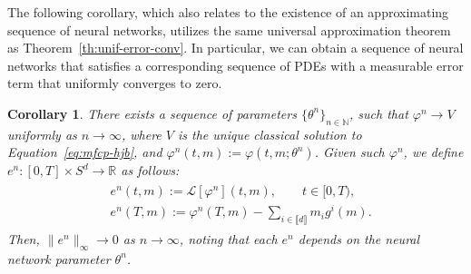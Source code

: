 \documentclass[11pt,reqno]{amsart}
\numberwithin{equation}{section}
\theoremstyle{plain}
\newtheorem{corollary}[theorem]{Corollary}
\newcommand{\R}{\mathbb{R}}
\newcommand{\sL}{\mathcal{L}}
\newcommand{\N}{\mathbb{N}}
\newcommand{\lbrs}[1]{\llbracket #1 \rrbracket}
\begin{document}
The following corollary, which also relates to the existence of an approximating sequence of neural networks, utilizes the same universal approximation theorem as Theorem~\ref{th:unif-error-conv}. In particular, we can obtain a sequence of neural networks that satisfies a corresponding sequence of PDEs with a measurable error term that uniformly converges to zero.
\begin{corollary}
\label{corr:convergence-to-v}
There exists a sequence of 
parameters $\{\theta^n\}_{n \in \N}$, such that $\varphi^n \to V$ uniformly as $n \to \infty$, where $V$ is the unique classical solution to Equation~\eqref{eq:mfcp-hjb},
and $\varphi^n(t,m):=\varphi(t,m;\theta^n)$.
Given such $\varphi^n$, we define $e^n : [0, T] \times S^d \to \R$ as follows:
\begin{align}
\label{eq:corr-hjb}
\begin{split}
    &e^n(t, m):=\sL[\varphi^n](t, m) ,\qquad t\in[0,T),\\
    &e^n(T, m):=\varphi^n(T, m) - \sum_{i \in \lbrs{d}} m_i g^i(m) .
\end{split}
\end{align}
Then, $\|e^n\|_{\infty} \to 0$ as $n \to \infty$, noting that each $e^n$ depends on the neural network parameter $\theta^n$.
\end{corollary}
\end{document}
